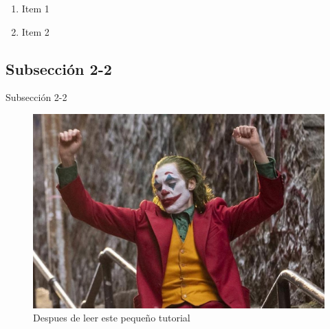 \documentclass[runningheads]{llncs}
\begin{document}
\begin{enumerate}
    \item Item 1
    \item Item 2
\end{enumerate}

\subsection{Subsección 2-2}
Subsección 2-2

\begin{figure}
    \centering %
    \includegraphics[scale=0.2]{images/joker.jpg}
    \caption{Despues de leer este pequeño tutorial}
\end{figure}




\end{document}

